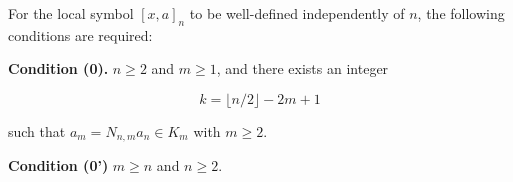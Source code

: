 For the local symbol $[x, a]_n$ to be well-defined independently of $n$, the following conditions are required:

\textbf{Condition (0).} $n \geq 2$ and $m \geq 1$, and there exists an integer

$$
k = \lfloor n/2 \rfloor - 2m + 1
$$

such that $a_m = N_{n,m} a_n \in K_m$ with $m \geq 2$.

\textbf{Condition (0')} $m \geq n$ and $n \geq 2$.

